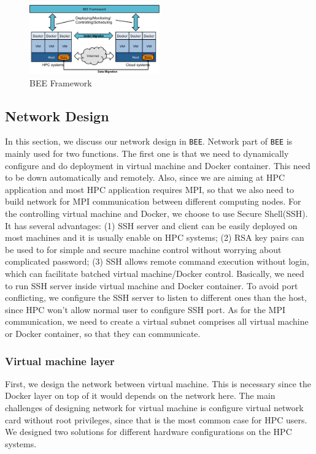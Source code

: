 \begin{figure}[h]
    \centering
    \caption{BEE Framework}
    \label{bee-framework}
    \includegraphics[width=0.5\textwidth]{figures/bee-framework.pdf}
\end{figure}
 
\subsection{Network Design}
In this section, we discuss our network design in \texttt{BEE}. Network part of \texttt{BEE} is mainly used for two functions. The first one is that we need to dynamically configure and do deployment in virtual machine and Docker container. This need to be down automatically and remotely. Also, since we are aiming at HPC application and most HPC application requires MPI, so that we also need to build network for MPI communication between different computing nodes. For the controlling virtual machine and Docker, we choose to use Secure Shell(SSH). It has several advantages: (1) SSH server and client can be easily deployed on most machines and it is usually enable on HPC systems; (2) RSA key pairs can be used to for simple and secure machine control without worrying about complicated password; (3) SSH allows remote command execution without login, which can facilitate batched virtual machine/Docker control. Basically, we need to run SSH server inside virtual machine and Docker container. To avoid port conflicting, we configure the SSH server to listen to different ones than the host, since HPC won't allow normal user to configure SSH port. As for the MPI communication, we need to create a virtual subnet comprises all virtual machine or Docker container, so that they can communicate.

\subsubsection{Virtual machine layer}

First, we design the network between virtual machine. This is necessary since the Docker layer on top of it would depends on the network here. The main challenges of designing network for virtual machine is configure virtual network card without root privileges, since that is the most common case for HPC users. We designed two solutions for different hardware configurations on the HPC systems.

